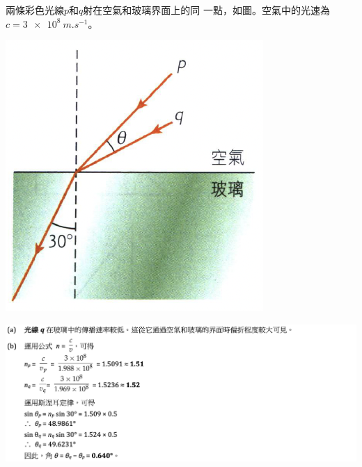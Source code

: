 {
    兩條彩色光線$p$和$q$射在空氣和玻璃界面上的同 一點，如圖。空氣中的光速為$c=\qty{3e8}{m.s^{-1}}$。
    \par{\par\centering\includegraphics[width=.35\textwidth]{./img/ch2_refraction_lq_2024-05-18-17-17-27.png}\par}
}{
    \par{\par\centering\includegraphics[width=\textwidth]{./img/ch2_refraction_lq_2024-05-18-17-35-54.png}\par}
}

